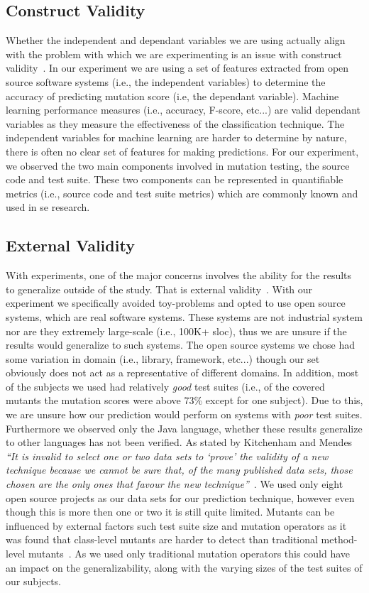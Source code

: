 \subsection{Construct Validity}
\label{subsec:experiment_construct_validity}
Whether the independent and dependant variables we are using actually align with the problem with which we are experimenting is an issue with construct validity~\cite{WRH+00,WKP10}. In our experiment we are using a set of features extracted from open source software systems (i.e., the independent variables) to determine the accuracy of predicting mutation score (i.e, the dependant variable). Machine learning performance measures (i.e., accuracy, F-score, etc...) are valid dependant variables as they measure the effectiveness of the classification technique. The independent variables for machine learning are harder to determine by nature, there is often no clear set of features for making predictions. For our experiment, we observed the two main components involved in mutation testing, the source code and test suite. These two components can be represented in quantifiable metrics (i.e., source code and test suite metrics) which are commonly known and used in \gls{se} research.


\subsection{External Validity}
\label{subsec:experiment_external_validity}
With experiments, one of the major concerns involves the ability for the results to generalize outside of the study. That is external validity~\cite{WRH+00,WKP10}. With our experiment we specifically avoided toy-problems and opted to use open source systems, which are real software systems. These systems are not industrial system nor are they extremely large-scale (i.e., 100K+ \gls{sloc}), thus we are unsure if the results would generalize to such systems. The open source systems we chose had some variation in domain (i.e., library, framework, etc...) though our set obviously does not act as a representative of different domains. In addition, most of the subjects we used had relatively \emph{good} test suites (i.e., of the covered mutants the mutation scores were above 73\% except for one subject). Due to this, we are unsure how our prediction would perform on systems with \emph{poor} test suites. Furthermore we observed only the Java language, whether these results generalize to other languages has not been verified. As stated by Kitchenham and Mendes \emph{``It is invalid to select one or two data sets to `prove' the validity of a new technique because we cannot be sure that, of the many published data sets, those chosen are the only ones that favour the new technique''}~\cite{KM09}. We used only eight open source projects as our data sets for our prediction technique, however even though this is more then one or two it is still quite limited.  Mutants can be influenced by external factors such test suite size and mutation operators as it was found that class-level mutants are harder to detect than traditional method-level mutants~\cite{NK11}. As we used only traditional mutation operators this could have an impact on the generalizability, along with the varying sizes of the test suites of our subjects.

